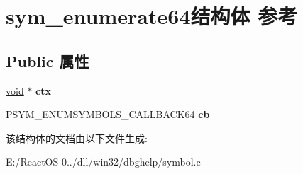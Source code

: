 \hypertarget{structsym__enumerate64}{}\section{sym\+\_\+enumerate64结构体 参考}
\label{structsym__enumerate64}
\subsection*{Public 属性}
\begin{DoxyCompactItemize}
\item 
\mbox{\label{structsym__enumerate64_adfb3570f8f2e5d405b7c78583deb035f}} 
\hyperlink{interfacevoid}{void} $\ast$ {\bfseries ctx}
\item 
\mbox{\label{structsym__enumerate64_ab3b936a229e55ffd39a0f6c804569a00}} 
P\+S\+Y\+M\+\_\+\+E\+N\+U\+M\+S\+Y\+M\+B\+O\+L\+S\+\_\+\+C\+A\+L\+L\+B\+A\+C\+K64 {\bfseries cb}
\end{DoxyCompactItemize}


该结构体的文档由以下文件生成\+:\begin{DoxyCompactItemize}
\item 
E\+:/\+React\+O\+S-\/0../dll/win32/dbghelp/symbol.\+c\end{DoxyCompactItemize}
